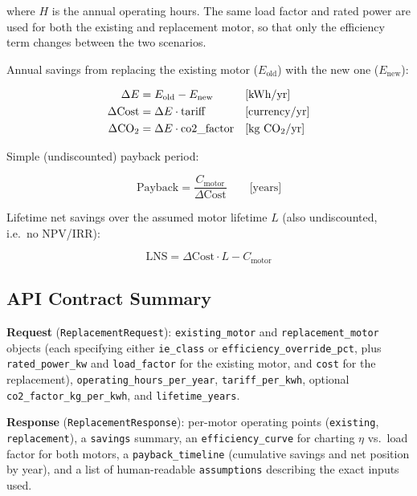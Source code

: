 \documentclass[11pt,a4paper]{article}
\newcommand{\code}[1]{\texttt{#1}}
\begin{document}
where $H$ is the annual operating hours. The same load factor and rated
power are used for both the existing and replacement motor, so that only the
efficiency term changes between the two scenarios.

Annual savings from replacing the existing motor ($E_{\mathrm{old}}$) with the
new one ($E_{\mathrm{new}}$):

\begin{align}
\Delta E &= E_{\mathrm{old}} - E_{\mathrm{new}} && \text{[kWh/yr]} \\
\Delta \mathrm{Cost} &= \Delta E \cdot \mathrm{tariff} && \text{[currency/yr]} \\
\Delta \mathrm{CO_2} &= \Delta E \cdot \mathrm{co2\_factor} && \text{[kg CO\textsubscript{2}/yr]}
\end{align}

Simple (undiscounted) payback period:

\begin{equation}
\mathrm{Payback} = \frac{C_{\mathrm{motor}}}{\Delta \mathrm{Cost}} \qquad \text{[years]}
\end{equation}

Lifetime net savings over the assumed motor lifetime $L$ (also undiscounted,
i.e.\ no NPV/IRR):

\begin{equation}
\mathrm{LNS} = \Delta \mathrm{Cost} \cdot L - C_{\mathrm{motor}}
\end{equation}

\subsection{API Contract Summary}

\textbf{Request} (\code{ReplacementRequest}): \code{existing\_motor} and
\code{replacement\_motor} objects (each specifying either \code{ie\_class} or
\code{efficiency\_override\_pct}, plus \code{rated\_power\_kw} and
\code{load\_factor} for the existing motor, and \code{cost} for the
replacement), \code{operating\_hours\_per\_year}, \code{tariff\_per\_kwh},
optional \code{co2\_factor\_kg\_per\_kwh}, and \code{lifetime\_years}.

\textbf{Response} (\code{ReplacementResponse}): per-motor operating points
(\code{existing}, \code{replacement}), a \code{savings} summary, an
\code{efficiency\_curve} for charting $\eta$ vs.\ load factor for both
motors, a \code{payback\_timeline} (cumulative savings and net position by
year), and a list of human-readable \code{assumptions} describing the exact
inputs used.
\end{document}
